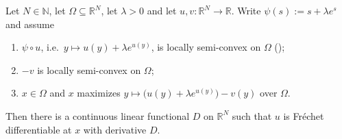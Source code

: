 \begin{lemma}
Let $N\in\mathbb N$, let $\Omega\subseteq\mathbb R^{N}$, let $\lambda>0$ and let
$u,v:\mathbb R^{N}\to\mathbb R$. Write $\psi(s):=s+\lambda e^{s}$ and assume
\begin{enumerate}
\item $\psi\circ u$, i.e.\ $y\mapsto u(y)+\lambda e^{u(y)}$, is locally semi-convex on
  $\Omega$ ();
\item $-v$ is locally semi-convex on $\Omega$;
\item $x\in\Omega$ and $x$ maximizes $y\mapsto\big(u(y)+\lambda e^{u(y)}\big)-v(y)$ over
  $\Omega$.
\end{enumerate}
Then there is a continuous linear functional $D$ on $\mathbb R^{N}$ such that $u$ is
Fr\'echet differentiable at $x$ with derivative $D$.
\end{lemma}
